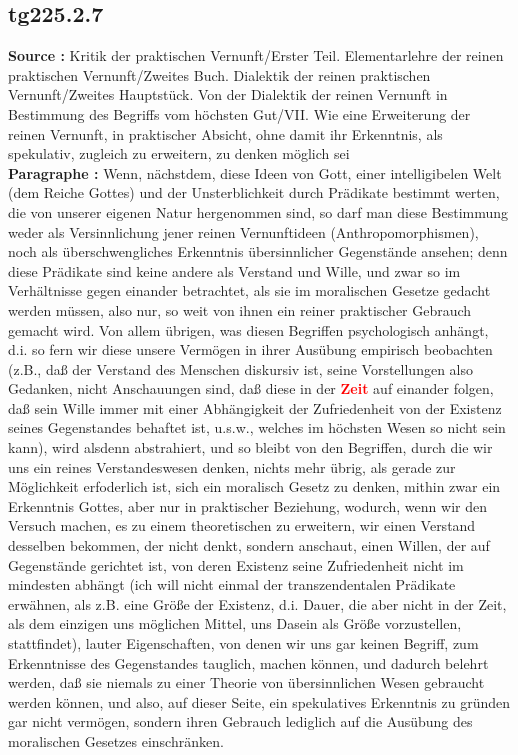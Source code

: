 \documentclass[a4paper,12pt,twoside]{book}
\newcommand{\match}[1]{\textcolor{red}{\textbf{#1}}}
\begin{document}
	\subsection*{tg225.2.7} 
	\textbf{Source : }Kritik der praktischen Vernunft/Erster Teil. Elementarlehre der reinen praktischen Vernunft/Zweites Buch. Dialektik der reinen praktischen Vernunft/Zweites Hauptstück. Von der Dialektik der reinen Vernunft in Bestimmung des Begriffs vom höchsten Gut/VII. Wie eine Erweiterung der reinen Vernunft, in praktischer Absicht, ohne damit ihr Erkenntnis, als spekulativ, zugleich zu erweitern, zu denken möglich sei\\  
	
	\noindent\textbf{Paragraphe : }
	Wenn, nächstdem, diese Ideen von Gott, einer intelligibelen Welt (dem Reiche Gottes) und der Unsterblichkeit durch Prädikate bestimmt werten, die von unserer eigenen Natur hergenommen sind, so darf man diese Bestimmung weder als Versinnlichung jener reinen Vernunftideen (Anthropomorphismen), noch als überschwengliches Erkenntnis übersinnlicher Gegenstände ansehen; denn diese Prädikate sind keine andere als Verstand und Wille, und zwar so im Verhältnisse gegen einander betrachtet, als sie im moralischen Gesetze gedacht werden müssen, also nur, so weit von ihnen ein reiner praktischer Gebrauch gemacht wird. Von allem übrigen, was diesen Begriffen psychologisch anhängt, d.i. so fern wir diese unsere Vermögen in ihrer Ausübung empirisch beobachten (z.B., daß der Verstand des Menschen diskursiv ist, seine Vorstellungen also Gedanken, nicht Anschauungen sind, daß diese in der \match{Zeit} auf einander folgen, daß sein Wille immer mit einer Abhängigkeit der Zufriedenheit von der Existenz seines Gegenstandes behaftet ist, u.s.w., welches im höchsten Wesen so nicht sein kann), wird alsdenn abstrahiert, und so bleibt von den Begriffen, durch die wir uns ein reines Verstandeswesen denken, nichts mehr übrig, als gerade zur Möglichkeit erfoderlich ist, sich ein moralisch Gesetz zu denken, mithin zwar ein Erkenntnis Gottes, aber nur in praktischer Beziehung, wodurch, wenn wir den Versuch machen, es zu einem theoretischen zu erweitern, wir einen Verstand desselben bekommen, der nicht denkt, sondern anschaut, einen Willen, der auf Gegenstände gerichtet ist, von deren Existenz seine Zufriedenheit nicht im mindesten abhängt (ich will nicht einmal der transzendentalen Prädikate erwähnen, als z.B. eine Größe der Existenz, d.i. Dauer, die aber nicht in der Zeit, als dem einzigen uns möglichen Mittel, uns Dasein als Größe vorzustellen, stattfindet), lauter Eigenschaften, von denen wir uns gar keinen Begriff, zum Erkenntnisse des Gegenstandes tauglich, machen können, und dadurch belehrt werden, daß sie niemals zu einer Theorie von übersinnlichen Wesen gebraucht werden können, und also, auf dieser Seite, ein spekulatives Erkenntnis zu  gründen gar nicht vermögen, sondern ihren Gebrauch lediglich auf die Ausübung des moralischen Gesetzes einschränken. 
	
\end{document}
